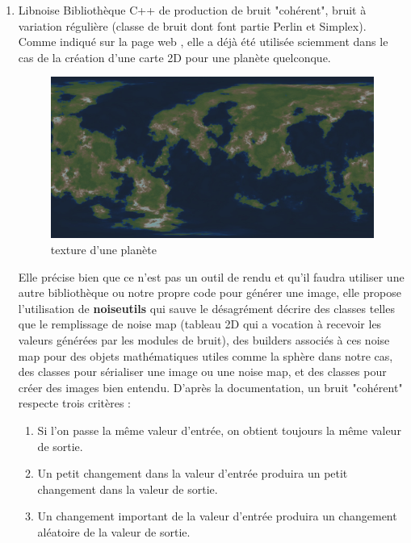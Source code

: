 \documentclass[12pt]{report}
\begin{document}
\begin{enumerate}
    \item Libnoise
    Bibliothèque C++ de production de bruit "cohérent", bruit à variation régulière (classe de bruit dont font partie Perlin et Simplex). Comme indiqué sur la page web \cite{libnoisewebsite}, elle a déjà été utilisée sciemment dans le cas de la création d'une carte 2D pour une planète quelconque. 
    
    \begin{figure}[h]
    \centering
    \includegraphics[scale = 0.05]{images/planet.jpg}
    \caption{texture d'une planète}
    \end{figure}
 
    Elle précise bien que ce n'est pas un outil de rendu et qu'il faudra utiliser une autre bibliothèque ou notre propre code pour générer une image, elle propose l'utilisation de \textbf{noiseutils} qui sauve le désagrément décrire des classes telles que le remplissage de noise map (tableau 2D qui a vocation à recevoir les valeurs générées par les modules de bruit), des builders associés à ces noise map pour des objets mathématiques utiles comme la sphère dans notre cas, des classes pour sérialiser une image ou une noise map, et des classes pour créer des images bien entendu. 
     \newline D'après la documentation, un bruit "cohérent" respecte trois critères :
    \begin{enumerate}
        \item Si l'on passe la même valeur d'entrée, on obtient toujours la même valeur de sortie.
        \item Un petit changement dans la valeur d'entrée produira un petit changement dans la valeur de sortie.
        \item Un changement important de la valeur d'entrée produira un changement aléatoire de la valeur de sortie.
    \end{enumerate}
    

\end{enumerate}
\end{document}
